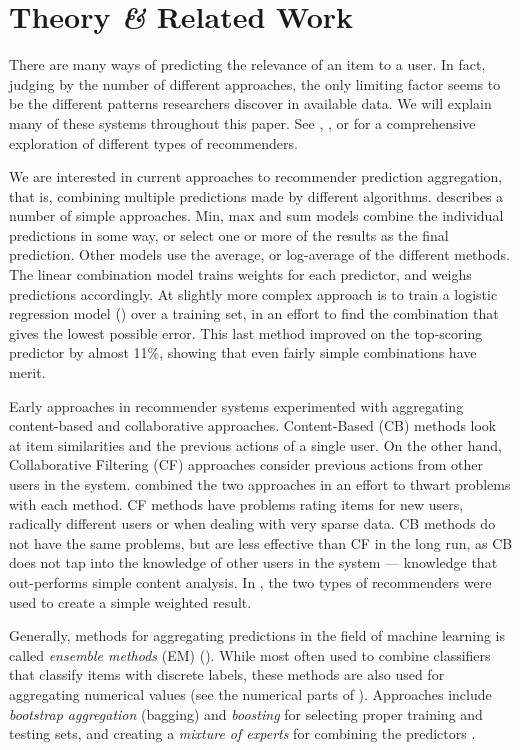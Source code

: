 \section{Theory \emph{\&} Related Work}

There are many ways of predicting the
relevance of an item to a user. 
In fact, judging by the number of different approaches,
the only limiting factor seems to be the different 
patterns researchers discover in available data.
We will explain many of these systems throughout this paper.
See 
\cite{Adomavicius2005}, \cite{Pazzani2007}, \cite{Schafer2007} 
or \cite{Bjorkoy2010d} for a comprehensive exploration 
of different types of recommenders.

We are interested in current approaches to recommender prediction aggregation,
that is, combining multiple predictions made by different algorithms.
\cite{Aslam2001} describes a number of simple approaches.
Min, max and sum models combine the individual predictions in some way, 
or select one or more of the results as the final prediction. 
Other models use the average, or log-average of the different methods.
The linear combination model trains weights for each predictor, and weighs predictions accordingly.
At slightly more complex approach is to train a logistic regression model (\cite[p3]{Aslam2001})
over a training set, in an effort to find the combination that gives the lowest possible error.
This last method improved on the top-scoring predictor by almost 11\%,
showing that even fairly simple combinations have merit.

Early approaches in recommender systems experimented with aggregating content-based and collaborative approaches.
Content-Based (CB) methods look at item similarities and the previous actions of a single user.
On the other hand, Collaborative Filtering (CF) approaches consider
previous actions from other users in the system.
\cite{Claypool1999} combined the two approaches in an effort to thwart problems with each method.
CF methods have problems rating items for new users, radically different users or when dealing with very sparse data.
CB methods do not have the same problems, but are less effective than CF in the long run, as CB does not tap into the 
knowledge of other users in the system --- knowledge that out-performs simple content analysis.
In \cite{Claypool1999}, the two types of recommenders were used to create a simple weighted result.

Generally, methods for aggregating predictions in the field of machine learning is called \emph{ensemble methods} (EM) (\cite{Dietterich2000}).
While most often used to combine classifiers that classify items with discrete labels,
these methods are also used for aggregating numerical values (see the numerical parts of \cite{Breiman1996}).
Approaches include \emph{bootstrap aggregation} (bagging) and \emph{boosting} 
for selecting proper training and testing sets,
and creating a \emph{mixture of experts} for combining the predictors
\cite[p.27]{Polikar2006}.

